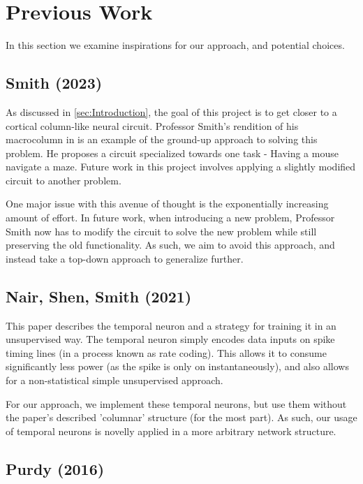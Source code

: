 \section{Previous Work} \label{sec:PreviousWork}

In this section we examine inspirations for our approach, and potential choices.

\subsection{Smith (2023)}

As discussed in \ref{sec:Introduction}, the goal of this project is to get
closer to a cortical column-like neural circuit. Professor Smith's rendition of
his macrocolumn in \cite{Macrocolumn} is an example of the ground-up approach to
solving this problem. He proposes a circuit specialized towards one task -
Having a mouse navigate a maze. Future work in this project involves applying
a slightly modified circuit to another problem.

One major issue with this avenue of thought is the exponentially increasing
amount of effort. In future work, when introducing a new problem, Professor
Smith now has to modify the circuit to solve the new problem while still
preserving the old functionality. As such, we aim to avoid this approach, and
instead take a top-down approach to generalize further.

\subsection{Nair, Shen, Smith (2021)}

This paper \cite{TNN} describes the temporal neuron and a strategy for training
it in an unsupervised way. The temporal neuron simply encodes data inputs on
spike timing lines (in a process known as rate coding). This allows it to
consume significantly less power (as the spike is only on instantaneously), and
also allows for a non-statistical simple unsupervised approach.

For our approach, we implement these temporal neurons, but use them without the
paper's described 'columnar' structure (for the most part). As such, our usage
of temporal neurons is novelly applied in a more arbitrary network structure.

\subsection{Purdy (2016)}


